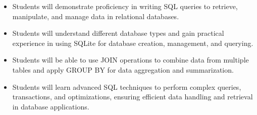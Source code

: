 \begin{itemize}
    \item Students will demonstrate proficiency in writing SQL queries to retrieve, manipulate, and manage data in relational databases.
    \item Students will understand different database types and gain practical experience in using SQLite for database creation, management, and querying.
    \item Students will be able to use JOIN operations to combine data from multiple tables and apply GROUP BY for data aggregation and summarization.
    \item Students will learn advanced SQL techniques to perform complex queries, transactions, and optimizations, ensuring efficient data handling and retrieval in database applications.
\end{itemize}
